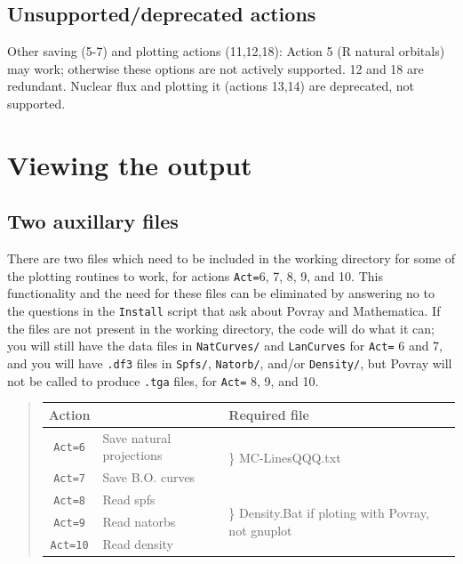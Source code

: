 \documentclass[10pt,leqno, oneside]{book}
\begin{document}
\section{Unsupported/deprecated actions}

Other saving (5-7) and plotting actions (11,12,18):
Action 5 (R natural orbitals) may work; otherwise these options are not actively supported.  12 and 18 are redundant.
Nuclear flux and plotting it (actions 13,14) are deprecated, not supported.


\chapter{Viewing the output}

\section{Two auxillary files}

There are two files which need to be included in the working directory for some of the plotting routines to work, for actions \verb#Act=#6, 7, 8, 9, and 10.  This functionality and the need for these files can be eliminated by answering no to the questions in the \verb#Install# script that ask about Povray and Mathematica.  If the files are not present in the working directory, the code will do what it can; you will still have the data files in \verb#NatCurves/# and \verb#LanCurves# for \verb#Act=# 6 and 7, and you will have \verb#.df3# files in \verb#Spfs/#, \verb#Natorb/#, and/or \verb#Density/#, but Povray will not be called to produce \verb#.tga# files, for \verb#Act=# 8, 9, and 10.
\begin{quote}
\begin{tabular}{cll}
Action & & Required file \\
\hline
\verb#Act=6# & Save natural projections & \multirow{2}{*}{{\Large\}} MC-LinesQQQ.txt} \\
\verb#Act=7# & Save B.O. curves & \\
\verb#Act=8# & Read spfs & \multirow{3}{*}{{\Huge\}} Density.Bat if  ploting with Povray, not gnuplot }\\
\verb#Act=9# & Read natorbs &\\
\verb#Act=10# & Read density &\\
\end{tabular}
\end{quote}

\end{document}
